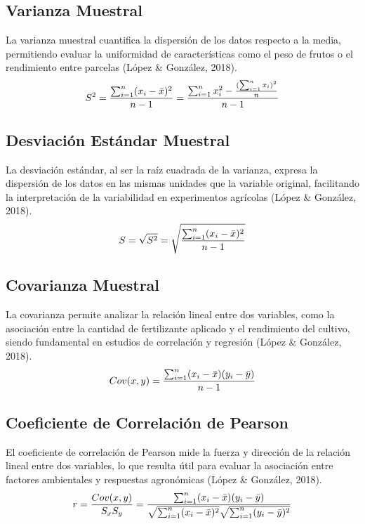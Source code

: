 \documentclass[
  spanish,
  letterpaper,
]{book}
\begin{document}
\subsection{Varianza Muestral}\label{varianza-muestral}

La varianza muestral cuantifica la dispersión de los datos respecto a la
media, permitiendo evaluar la uniformidad de características como el
peso de frutos o el rendimiento entre parcelas (López \& González,
2018). \[
\LARGE
S^2 = \frac{\sum_{i=1}^{n} (x_i - \bar{x})^2}{n-1} = \frac{\sum_{i=1}^{n} x_i^2 - \frac{(\sum_{i=1}^{n} x_i)^2}{n}}{n-1}
\]

\subsection{Desviación Estándar
Muestral}\label{desviaciuxf3n-estuxe1ndar-muestral}

La desviación estándar, al ser la raíz cuadrada de la varianza, expresa
la dispersión de los datos en las mismas unidades que la variable
original, facilitando la interpretación de la variabilidad en
experimentos agrícolas (López \& González, 2018). \[
\LARGE
S = \sqrt{S^2} = \sqrt{\frac{\sum_{i=1}^{n} (x_i - \bar{x})^2}{n-1}}
\]

\subsection{Covarianza Muestral}\label{covarianza-muestral}

La covarianza permite analizar la relación lineal entre dos variables,
como la asociación entre la cantidad de fertilizante aplicado y el
rendimiento del cultivo, siendo fundamental en estudios de correlación y
regresión (López \& González, 2018). \[
\huge
Cov(x, y) = \frac{\sum_{i=1}^{n} (x_i - \bar{x})(y_i - \bar{y})}{n-1}
\]

\subsection{Coeficiente de Correlación de
Pearson}\label{coeficiente-de-correlaciuxf3n-de-pearson}

El coeficiente de correlación de Pearson mide la fuerza y dirección de
la relación lineal entre dos variables, lo que resulta útil para evaluar
la asociación entre factores ambientales y respuestas agronómicas (López
\& González, 2018). \[
\LARGE
r = \frac{Cov(x, y)}{S_x S_y} = \frac{\sum_{i=1}^{n} (x_i - \bar{x})(y_i - \bar{y})}{\sqrt{\sum_{i=1}^{n} (x_i - \bar{x})^2} \sqrt{\sum_{i=1}^{n} (y_i - \bar{y})^2}}
\]
\end{document}
